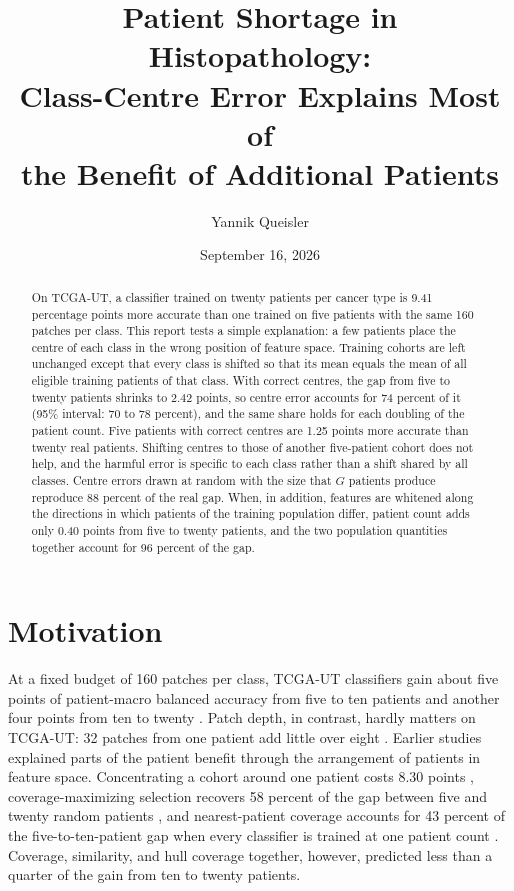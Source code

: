 \documentclass[11pt]{article}
\title{Patient Shortage in Histopathology:\\Class-Centre Error Explains Most of\\the Benefit of Additional Patients}
\author{Yannik Queisler}
\date{September 16, 2026}
\begin{document}
\raggedbottom
{}
\setlength{\emergencystretch}{2em}
\maketitle
\begin{abstract}
\noindent On TCGA-UT, a classifier trained on twenty patients per cancer type is 9.41 percentage points more accurate than one trained on five patients with the same 160 patches per class. This report tests a simple explanation: a few patients place the centre of each class in the wrong position of feature space. Training cohorts are left unchanged except that every class is shifted so that its mean equals the mean of all eligible training patients of that class. With correct centres, the gap from five to twenty patients shrinks to 2.42 points, so centre error accounts for 74 percent of it (95\% interval: 70 to 78 percent), and the same share holds for each doubling of the patient count. Five patients with correct centres are 1.25 points more accurate than twenty real patients. Shifting centres to those of another five-patient cohort does not help, and the harmful error is specific to each class rather than a shift shared by all classes. Centre errors drawn at random with the size that $G$ patients produce reproduce 88 percent of the real gap. When, in addition, features are whitened along the directions in which patients of the training population differ, patient count adds only 0.40 points from five to twenty patients, and the two population quantities together account for 96 percent of the gap.
\end{abstract}

\section{Motivation}
\label{sec:motivation}
At a fixed budget of 160 patches per class, TCGA-UT classifiers gain about five points of patient-macro balanced accuracy from five to ten patients and another four points from ten to twenty \citep{queisler2026effectiveSupport,queisler2026hullCoverage}. Patch depth, in contrast, hardly matters on TCGA-UT: 32 patches from one patient add little over eight \citep{queisler2026effectiveSupport}. Earlier studies explained parts of the patient benefit through the arrangement of patients in feature space. Concentrating a cohort around one patient costs 8.30 points \citep{queisler2026cohortComposition}, coverage-maximizing selection recovers 58 percent of the gap between five and twenty random patients \citep{queisler2026shortageSelection}, and nearest-patient coverage accounts for 43 percent of the five-to-ten-patient gap when every classifier is trained at one patient count \citep{queisler2026hullCoverage}. Coverage, similarity, and hull coverage together, however, predicted less than a quarter of the gain from ten to twenty patients.
\end{document}
